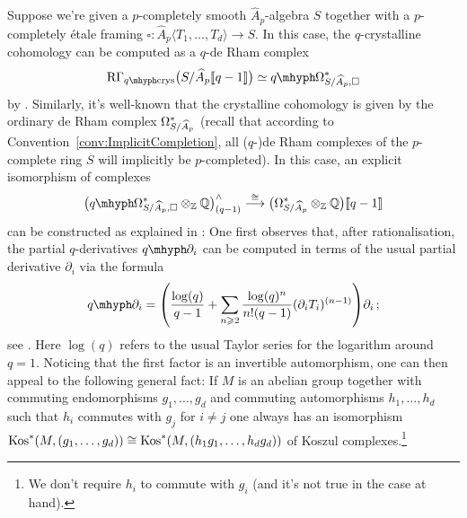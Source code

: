 \documentclass[DIV=12,numbers=enddot,leqno,bibliography=totoc]{scrartcl}
\begin{document}
	\begin{numpar}\label{par:RationalisedqDeRham}
		Suppose we're given a $p$-completely smooth $\widehat{A}_p$-algebra $S$ together with a $p$-completely étale framing $\square\colon \widehat{A}_p\langle T_1,\dotsc,T_d\rangle\rightarrow S$. In this case, the $q$-crystalline cohomology can be computed as a $q$-de Rham complex
		\begin{equation*}
			\R\Gamma_\qcrys\bigl(S/\widehat{A}_p\qpower\bigr)\simeq \qOmega_{S/\smash{\widehat{A}}_p, \square}^*
		\end{equation*}
		by \cite[Theorem~]{Prismatic}. Similarly, it's well-known that the crystalline cohomology is given by the ordinary de Rham complex $\Omega_{S/\smash{\widehat{A}}_p}^*$ (recall that according to Convention~\cref{conv:ImplicitCompletion}, all ($q$-)de Rham complexes of the $p$-complete ring $S$ will implicitly be $p$-completed). In this case, an explicit isomorphism of complexes
		\begin{equation*}
			\bigl(\qOmega_{S/\smash{\widehat{A}}_p, \square}^*\otimes_{\IZ}\IQ\bigr)_{(q-1)}^\complete\overset{\cong}{\longrightarrow} \bigl(\Omega_{S/\smash{\widehat{A}}_p}^*\otimes_{\IZ}\IQ\bigr)\qpower
		\end{equation*}
		can be constructed as explained in \cite[Lemma~]{Toulouse}: One first observes that, after rationalisation, the partial $q$-derivatives $\q\partial_i$ can be computed in terms of the usual partial derivative $\partial_i$ via the formula
		\begin{equation*}
			\q\partial_i=\left(\frac{\log(q)}{q-1}+\sum_{n\geqslant 2}\frac{\log(q)^n}{n!(q-1)}(\partial_iT_i)^{(n-1)}\right)\partial_i\,;
		\end{equation*}
		see \cite[Lemma~]{BMS1}. Here $\log(q)$ refers to the usual Taylor series for the logarithm around $q=1$. Noticing that the first factor is an invertible automorphism, one can then appeal to the following general fact: If $M$ is an abelian group together with commuting endomorphisms $g_1,\dotsc,g_d$ and commuting automorphisms $h_1,\dotsc,h_d$ such that $h_i$ commutes with $g_j$ for $i\neq j$ one always has an isomorphism $\operatorname{Kos}^*(M,(g_1,\dotsc,g_d))\cong \operatorname{Kos}^*(M,(h_1g_1,\dotsc,h_dg_d))$ of Koszul complexes.\footnote{We don't require $h_i$ to commute with $g_i$ (and it's not true in the case at hand).}
		

\end{numpar}
\end{document}
